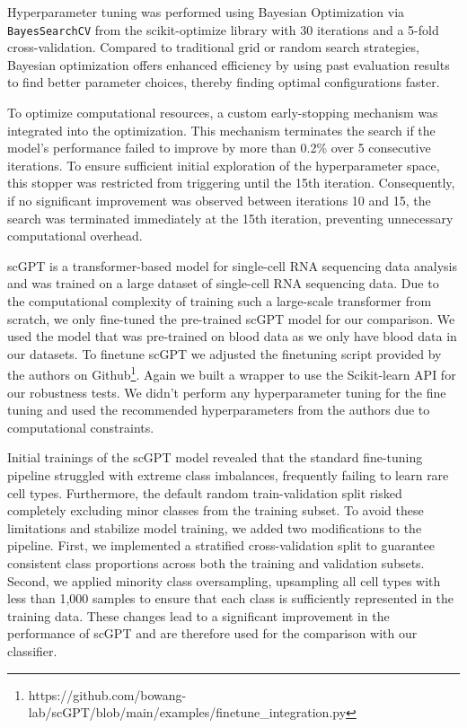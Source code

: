 \documentclass[11pt]{article}
\begin{document}
Hyperparameter tuning was performed using Bayesian Optimization via \texttt{BayesSearchCV} from the scikit-optimize library \cite{scikit-optimize_contributors_skoptbayessearchcv_2020} with 30 iterations and a 5-fold cross-validation. Compared to traditional grid or random search strategies, Bayesian optimization offers enhanced efficiency by using past evaluation results to find better parameter choices, thereby finding optimal configurations faster. \cite{NIPS2012_05311655}

To optimize computational resources, a custom early-stopping mechanism was integrated into the optimization. This mechanism terminates the search if the model's performance failed to improve by more than 0.2\% over 5 consecutive iterations. To ensure sufficient initial exploration of the hyperparameter space, this stopper was restricted from triggering until the 15th iteration. Consequently, if no significant improvement was observed between iterations 10 and 15, the search was terminated immediately at the 15th iteration, preventing unnecessary computational overhead.


scGPT \cite{cui_scgpt_2024} is a transformer-based model for single-cell RNA sequencing data analysis and was trained on a large dataset of single-cell RNA sequencing data. 
Due to the computational complexity of training such a large-scale transformer from scratch, we only fine-tuned the pre-trained scGPT model for our comparison. We used the model that was pre-trained on blood data as we only have blood data in our datasets. To finetune scGPT we adjusted the finetuning script provided by the authors on Github\footnote{https://github.com/bowang-lab/scGPT/blob/main/examples/finetune\_integration.py}. Again we built a wrapper to use the Scikit-learn API for our robustness tests.
We didn't perform any hyperparameter tuning for the fine tuning and used the recommended hyperparameters from the authors due to computational constraints.

Initial trainings of the scGPT model revealed that the standard fine-tuning pipeline struggled with extreme class imbalances, frequently failing to learn rare cell types. Furthermore, the default random train-validation split risked completely excluding minor classes from the training subset. To avoid these limitations and stabilize model training, we added two modifications to the pipeline. First, we implemented a stratified cross-validation split to guarantee consistent class proportions across both the training and validation subsets. Second, we applied minority class oversampling, upsampling all cell types with less than 1,000 samples to ensure that each class is sufficiently represented in the training data. These changes lead to a significant improvement in the performance of scGPT and are therefore used for the comparison with our classifier.
\end{document}

